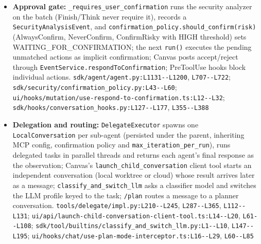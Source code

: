 \begin{itemize}
\item \textbf{Approval gate:} \texttt{\_\allowbreak{}requires\_\allowbreak{}user\_\allowbreak{}confirmation} runs the security analyzer on the batch (Finish/Think never require it), records a \texttt{SecurityAnalysisEvent}, and \texttt{confirmation\_\allowbreak{}policy.\allowbreak{}should\_\allowbreak{}confirm(\allowbreak{}risk)} (AlwaysConfirm, NeverConfirm, ConfirmRisky with HIGH threshold) sets WAITING\_FOR\_CONFIRMATION; the next \texttt{run(\allowbreak{})} executes the pending unmatched actions as implicit confirmation; Canvas posts accept/reject through \texttt{EventService.\allowbreak{}respondToConfirmation}; PreToolUse hooks block individual actions. \texttt{sdk/\allowbreak{}agent/\allowbreak{}agent.\allowbreak{}py:\allowbreak{}L1131-\allowbreak{}-\allowbreak{}L1200}, \texttt{L707-\allowbreak{}-\allowbreak{}L722}; \texttt{sdk/\allowbreak{}security/\allowbreak{}confirmation\_\allowbreak{}policy.\allowbreak{}py:\allowbreak{}L43-\allowbreak{}-\allowbreak{}L60}; \texttt{ui/\allowbreak{}hooks/\allowbreak{}mutation/\allowbreak{}use-\allowbreak{}respond-\allowbreak{}to-\allowbreak{}confirmation.\allowbreak{}ts:\allowbreak{}L12-\allowbreak{}-\allowbreak{}L32}; \texttt{sdk/\allowbreak{}hooks/\allowbreak{}conversation\_\allowbreak{}hooks.\allowbreak{}py:\allowbreak{}L127-\allowbreak{}-\allowbreak{}L177}, \texttt{L355-\allowbreak{}-\allowbreak{}L388}
\item \textbf{Delegation and routing:} \texttt{DelegateExecutor} spawns one \texttt{LocalConversation} per sub-agent (persisted under the parent, inheriting MCP config, confirmation policy and \texttt{max\_\allowbreak{}iteration\_\allowbreak{}per\_\allowbreak{}run}), runs delegated tasks in parallel threads and returns each agent's final response as the observation; Canvas's \texttt{launch\_\allowbreak{}child\_\allowbreak{}conversation} client tool starts an independent conversation (local worktree or cloud) whose result arrives later as a message; \texttt{classify\_\allowbreak{}and\_\allowbreak{}switch\_\allowbreak{}llm} asks a classifier model and switches the LLM profile keyed to the task; \texttt{/\allowbreak{}plan} routes a message to a planner conversation. \texttt{tools/\allowbreak{}delegate/\allowbreak{}impl.\allowbreak{}py:\allowbreak{}L210-\allowbreak{}-\allowbreak{}L245}, \texttt{L287-\allowbreak{}-\allowbreak{}L365}, \texttt{L112-\allowbreak{}-\allowbreak{}L131}; \texttt{ui/\allowbreak{}api/\allowbreak{}launch-\allowbreak{}child-\allowbreak{}conversation-\allowbreak{}client-\allowbreak{}tool.\allowbreak{}ts:\allowbreak{}L14-\allowbreak{}-\allowbreak{}L20}, \texttt{L61-\allowbreak{}-\allowbreak{}L108}; \texttt{sdk/\allowbreak{}tool/\allowbreak{}builtins/\allowbreak{}classify\_\allowbreak{}and\_\allowbreak{}switch\_\allowbreak{}llm.\allowbreak{}py:\allowbreak{}L1-\allowbreak{}-\allowbreak{}L10}, \texttt{L147-\allowbreak{}-\allowbreak{}L195}; \texttt{ui/\allowbreak{}hooks/\allowbreak{}chat/\allowbreak{}use-\allowbreak{}plan-\allowbreak{}mode-\allowbreak{}interceptor.\allowbreak{}ts:\allowbreak{}L16-\allowbreak{}-\allowbreak{}L29}, \texttt{L60-\allowbreak{}-\allowbreak{}L85}
\end{itemize}

